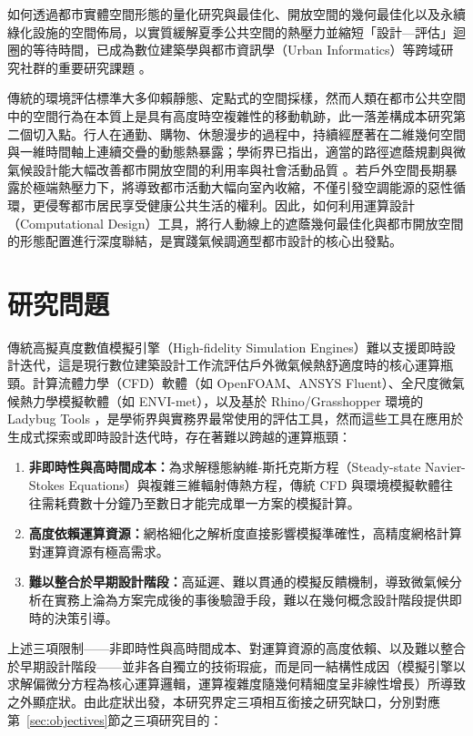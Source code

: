 如何透過都市實體空間形態的量化研究與最佳化、開放空間的幾何最佳化以及永續綠化設施的空間佈局，以實質緩解夏季公共空間的熱壓力並縮短「設計—評估」迴圈的等待時間，已成為數位建築學與都市資訊學（Urban Informatics）等跨域研究社群的重要研究課題 \citep{aman2023ai, westermann2019surrogate}。

傳統的環境評估標準大多仰賴靜態、定點式的空間採樣，然而人類在都市公共空間中的空間行為在本質上是具有高度時空複雜性的移動軌跡，此一落差構成本研究第二個切入點。行人在通勤、購物、休憩漫步的過程中，持續經歷著在二維幾何空間與一維時間軸上連續交疊的動態熱暴露；學術界已指出，適當的路徑遮蔭規劃與微氣候設計能大幅改善都市開放空間的利用率與社會活動品質 \citep{coccolo2018thermal}。若戶外空間長期暴露於極端熱壓力下，將導致都市活動大幅向室內收縮，不僅引發空調能源的惡性循環，更侵奪都市居民享受健康公共生活的權利。因此，如何利用運算設計（Computational Design）工具，將行人動線上的遮蔭幾何最佳化與都市開放空間的形態配置進行深度聯結，是實踐氣候調適型都市設計的核心出發點。


\section{研究問題}
\label{sec:problem}

傳統高擬真度數值模擬引擎（High-fidelity Simulation Engines）難以支援即時設計迭代，這是現行數位建築設計工作流評估戶外微氣候熱舒適度時的核心運算瓶頸。計算流體力學（CFD）軟體（如 OpenFOAM、ANSYS Fluent）、全尺度微氣候熱力學模擬軟體（如 ENVI-met），以及基於 Rhino/Grasshopper 環境的 Ladybug Tools \citep{sadeghipour2013ladybug}，是學術界與實務界最常使用的評估工具，然而這些工具在應用於生成式探索或即時設計迭代時，存在著難以跨越的運算瓶頸：

\begin{enumerate}
    \item \textbf{非即時性與高時間成本：}為求解穩態納維-斯托克斯方程（Steady-state Navier-Stokes Equations）與複雜三維輻射傳熱方程，傳統 CFD 與環境模擬軟體往往需耗費數十分鐘乃至數日才能完成單一方案的模擬計算。
    \item \textbf{高度依賴運算資源：}網格細化之解析度直接影響模擬準確性，高精度網格計算對運算資源有極高需求。
    \item \textbf{難以整合於早期設計階段：}高延遲、難以貫通的模擬反饋機制，導致微氣候分析在實務上淪為方案完成後的事後驗證手段，難以在幾何概念設計階段提供即時的決策引導。
\end{enumerate}

上述三項限制——非即時性與高時間成本、對運算資源的高度依賴、以及難以整合於早期設計階段——並非各自獨立的技術瑕疵，而是同一結構性成因（模擬引擎以求解偏微分方程為核心運算邏輯，運算複雜度隨幾何精細度呈非線性增長）所導致之外顯症狀。由此症狀出發，本研究界定三項相互銜接之研究缺口，分別對應第~\ref{sec:objectives}節之三項研究目的：

